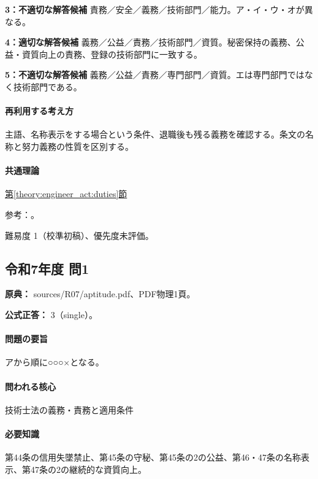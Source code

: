 \noindent\textbf{3：不適切な解答候補} 責務／安全／義務／技術部門／能力。ア・イ・ウ・オが異なる。\par

\noindent\textbf{4：適切な解答候補} 義務／公益／責務／技術部門／資質。秘密保持の義務、公益・資質向上の責務、登録の技術部門に一致する。\par

\noindent\textbf{5：不適切な解答候補} 義務／公益／責務／専門部門／資質。エは専門部門ではなく技術部門である。\par

\paragraph{再利用する考え方} 主語、名称表示をする場合という条件、退職後も残る義務を確認する。条文の名称と努力義務の性質を区別する。

\paragraph{共通理論} \hyperref[theory:engineer_act:duties]{第\ref*{theory:engineer_act:duties}節}

\par 参考：\cite{engineer_act_current}。

\par 難易度 1（校準初稿）、優先度未評価。

\subsection{令和7年度 問1}
\label{q:r07-reg-apt-01}

\noindent\textbf{原典：} sources/R07/aptitude.pdf、PDF物理1頁。

\textbf{公式正答：} 3（single）。

\paragraph{問題の要旨} アから順に○○○×となる。

\paragraph{問われる核心} 技術士法の義務・責務と適用条件

\paragraph{必要知識} 第44条の信用失墜禁止、第45条の守秘、第45条の2の公益、第46・47条の名称表示、第47条の2の継続的な資質向上。

